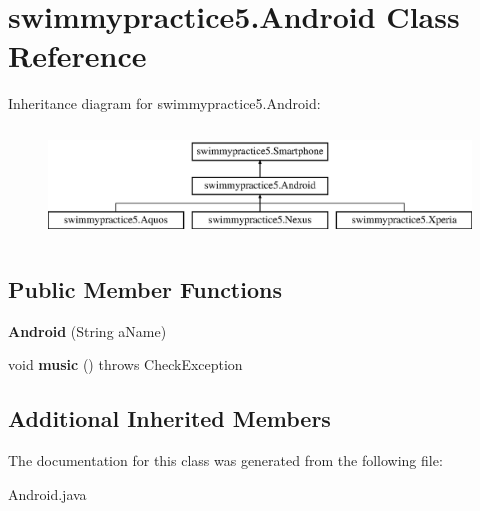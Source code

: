 \hypertarget{classswimmypractice5_1_1_android}{}\section{swimmypractice5.\+Android Class Reference}
\label{classswimmypractice5_1_1_android}
Inheritance diagram for swimmypractice5.\+Android\+:\begin{figure}[H]
\begin{center}
\leavevmode
\includegraphics[height=2.994653cm]{classswimmypractice5_1_1_android}
\end{center}
\end{figure}
\subsection*{Public Member Functions}
\begin{DoxyCompactItemize}
\item 
\mbox{\label{classswimmypractice5_1_1_android_a703e09e859a662d5388651e1b1f8664d}} 
{\bfseries Android} (String a\+Name)
\item 
\mbox{\label{classswimmypractice5_1_1_android_a3b33d85566b829f421c023fcdf91aef7}} 
void {\bfseries music} ()  throws Check\+Exception
\end{DoxyCompactItemize}
\subsection*{Additional Inherited Members}


The documentation for this class was generated from the following file\+:\begin{DoxyCompactItemize}
\item 
Android.\+java\end{DoxyCompactItemize}
